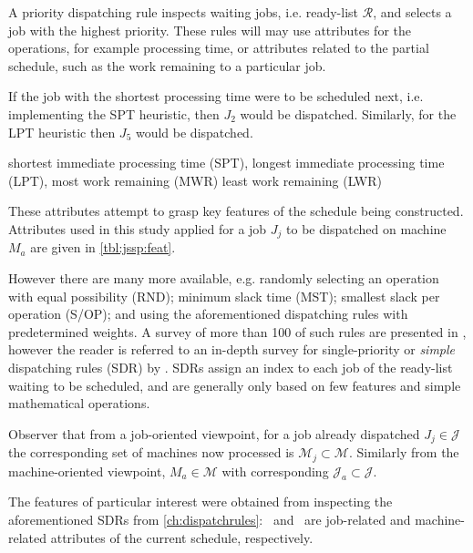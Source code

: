 \documentclass[smallextended]{svjour3}
\begin{document}
	A priority dispatching rule inspects waiting jobs, i.e. ready-list $\mathcal{R}$, and selects a job with the highest priority. These rules will may use attributes for the operations, for example processing time, or attributes related to the partial schedule, such as the work remaining to a particular job. 
	
	If the job with the shortest processing time were to be scheduled next, i.e. implementing the SPT heuristic, then $J_2$ would be dispatched. Similarly, for the LPT heuristic then $J_5$ would be dispatched. 
	
	shortest immediate processing time (SPT),  
	longest immediate processing time (LPT), 
	most work remaining (MWR) 
	least work remaining (LWR)
	
	
	
	These attributes attempt to grasp key features of the schedule being constructed. Attributes used in this study applied for a job $J_j$ to be dispatched on machine $M_a$ are given in \cref{tbl:jssp:feat}.  
	
	However there are many more available, e.g. randomly selecting an operation with equal possibility (RND); minimum slack time (MST); smallest slack per operation (S/OP); and using the aforementioned dispatching rules with predetermined weights. A survey of more than 100 of such rules are presented in \citet{Panwalkar77}, however the reader is referred to an in-depth survey for single-priority or \emph{simple} dispatching rules (SDR) by \citet{Haupt89}. 
	SDRs assign an index to each job of the ready-list waiting to be scheduled, and are generally only based on few features and simple mathematical operations. 
	
	
	
	Observer that from a job-oriented viewpoint, for a job already dispatched $J_j\in\mathcal{J}$ the corresponding set of machines now processed is $\mathcal{M}_j\subset\mathcal{M}$. Similarly from the machine-oriented viewpoint, $M_a\in\mathcal{M}$ with corresponding $\mathcal{J}_a\subset\mathcal{J}$. 
	
	
	
	
	
	
	
	
	
	
	The features of particular interest were obtained from inspecting the aforementioned SDRs from \cref{ch:dispatchrules}:  
	\phiJobRelated\ and \phiMacRelated\ are job-related and machine-related attributes of the current schedule, respectively. 
	
\end{document}
